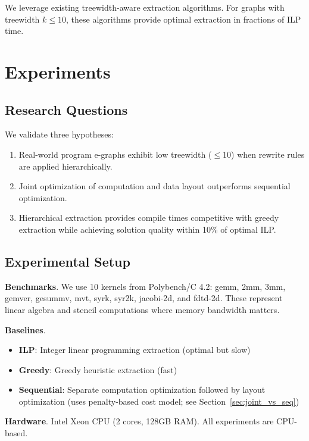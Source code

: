 \documentclass[11pt]{article}
\begin{document}
We leverage existing treewidth-aware extraction algorithms. For graphs with treewidth $k \leq 10$, these algorithms provide optimal extraction in fractions of ILP time.

\section{Experiments}
\label{sec:experiments}

\subsection{Research Questions}

We validate three hypotheses:
\begin{enumerate}
    \item[H1] Real-world program e-graphs exhibit low treewidth ($\leq$10) when rewrite rules are applied hierarchically.
    \item[H2] Joint optimization of computation and data layout outperforms sequential optimization.
    \item[H3] Hierarchical extraction provides compile times competitive with greedy extraction while achieving solution quality within 10\% of optimal ILP.
\end{enumerate}

\subsection{Experimental Setup}

\textbf{Benchmarks}. We use 10 kernels from Polybench/C 4.2: gemm, 2mm, 3mm, gemver, gesummv, mvt, syrk, syr2k, jacobi-2d, and fdtd-2d. These represent linear algebra and stencil computations where memory bandwidth matters.

\textbf{Baselines}.
\begin{itemize}
    \item \textbf{ILP}: Integer linear programming extraction (optimal but slow)
    \item \textbf{Greedy}: Greedy heuristic extraction (fast)
    \item \textbf{Sequential}: Separate computation optimization followed by layout optimization (uses penalty-based cost model; see Section~\ref{sec:joint_vs_seq})
\end{itemize}

\textbf{Hardware}. Intel Xeon CPU (2 cores, 128GB RAM). All experiments are CPU-based.
\end{document}
